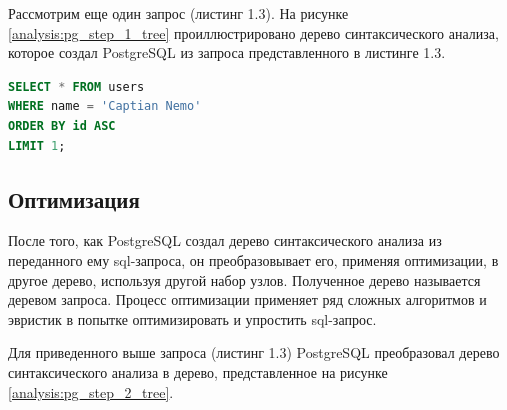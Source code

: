 Рассмотрим еще один запрос (листинг 1.3). 
На рисунке \ref{analysis:pg_step_1_tree} проиллюстрировано дерево синтаксического анализа, 
которое создал PostgreSQL из запроса представленного в листинге 1.3.

\begin{lstlisting}[language=sql, label=some-code, caption=Пример sql-запроса над таблицей users]
SELECT * FROM users
WHERE name = 'Captian Nemo'
ORDER BY id ASC
LIMIT 1;
\end{lstlisting}

\begin{figure}[ht!]
\end{figure}

\subsection{Оптимизация}

После того, как PostgreSQL создал дерево синтаксического анализа из переданного ему sql-запроса,
он преобразовывает его, применяя оптимизации, в другое дерево, используя другой набор узлов.
Полученное дерево называется деревом запроса.
Процесс оптимизации применяет ряд сложных алгоритмов и эвристик в 
попытке оптимизировать и упростить sql-запрос.

Для приведенного выше запроса (листинг 1.3) PostgreSQL преобразовал дерево 
синтаксического анализа в дерево,
представленное на рисунке \ref{analysis:pg_step_2_tree}.

\begin{figure}[ht!]
\end{figure}

